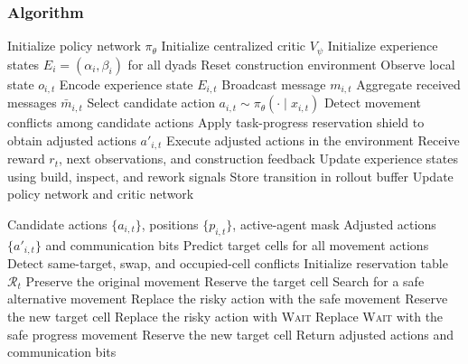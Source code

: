 \documentclass[fleqn,10pt]{wlpeerj}
\begin{document}
\subsubsection{Algorithm}
\begin{algorithm}[htbp]
\caption{CCT-MARL Training}
\label{alg:cct_training}
\begin{algorithmic}[1]
\STATE Initialize policy network $\pi_{\theta}$
\STATE Initialize centralized critic $V_{\psi}$
\STATE Initialize experience states $E_i=(\alpha_i,\beta_i)$ for all dyads
    \STATE Reset construction environment
            \STATE Observe local state $o_{i,t}$
            \STATE Encode experience state $E_{i,t}$
            \STATE Broadcast message $m_{i,t}$
            \STATE Aggregate received messages $\bar{m}_{i,t}$
            \STATE Select candidate action $a_{i,t} \sim \pi_{\theta}(\cdot \mid x_{i,t})$
        \ENDFOR
        \STATE Detect movement conflicts among candidate actions
        \STATE Apply task-progress reservation shield to obtain adjusted actions $a'_{i,t}$
        \STATE Execute adjusted actions in the environment
        \STATE Receive reward $r_t$, next observations, and construction feedback
        \STATE Update experience states using build, inspect, and rework signals
        \STATE Store transition in rollout buffer
    \ENDFOR
    \STATE Update policy network and critic network
\ENDFOR
\end{algorithmic}
\end{algorithm}

\begin{algorithm}[htbp]
\caption{Task-Progress Reservation Shield}
\label{alg:shield}
\begin{algorithmic}[1]
\REQUIRE Candidate actions $\{a_{i,t}\}$, positions $\{p_{i,t}\}$, active-agent mask
\ENSURE Adjusted actions $\{a'_{i,t}\}$ and communication bits
\STATE Predict target cells for all movement actions
\STATE Detect same-target, swap, and occupied-cell conflicts
\STATE Initialize reservation table $\mathcal{R}_t$
    \STATE Preserve the original movement
    \STATE Reserve the target cell
\ENDFOR
{}
    \STATE Search for a safe alternative movement
        \STATE Replace the risky action with the safe movement
        \STATE Reserve the new target cell
    \ELSE
        \STATE Replace the risky action with \textsc{Wait}
    \ENDIF
\ENDFOR
{}
        \STATE Replace \textsc{Wait} with the safe progress movement
        \STATE Reserve the new target cell
    \ENDIF
\ENDFOR
\STATE Return adjusted actions and communication bits
\end{algorithmic}
\end{algorithm}
\end{document}

